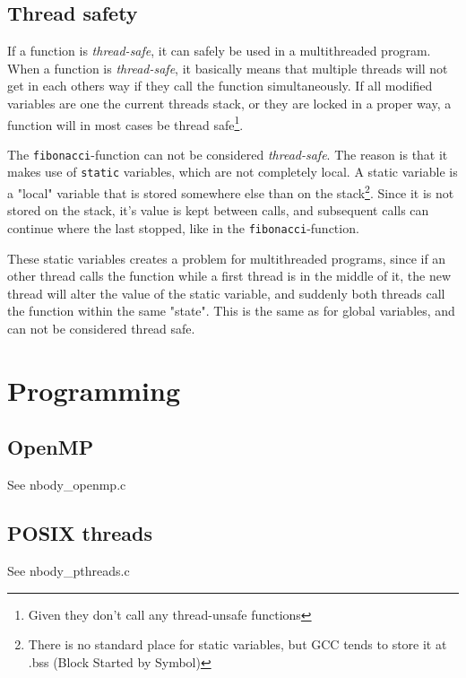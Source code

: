 \documentclass[english,a4paper,numbers=noenddot]{article}
\begin{document}
\subsection{Thread safety}
If a function is \textit{thread-safe}, it can safely be used in a multithreaded program. When a function is \textit{thread-safe}, it basically means that multiple threads will not get in each others way if they call the function simultaneously. If all modified variables are one the current threads stack, or they are locked in a proper way, a function will in most cases be thread safe\footnote{Given they don't call any thread-unsafe functions}. 

The \texttt{fibonacci}-function can not be considered \textit{thread-safe}. The reason is that it makes use of \texttt{static} variables, which are not completely local. A static variable is a "local" variable that is stored somewhere else than on the stack\footnote{There is no standard place for static variables, but GCC tends to store it at .bss (Block Started by Symbol)}. Since it is not stored on the stack, it's value is kept between calls, and subsequent calls can continue where the last stopped, like in the \texttt{fibonacci}-function.

These static variables creates a problem for multithreaded programs, since if an other thread calls the function while a first thread is in the middle of it, the new thread will alter the value of the static variable, and suddenly both threads call the function within the same "state". This is the same as for global variables, and can not be considered thread safe.

\section{Programming}
\subsection{OpenMP}
See nbody\_openmp.c
\subsection{POSIX threads}
See nbody\_pthreads.c
\end{document}
